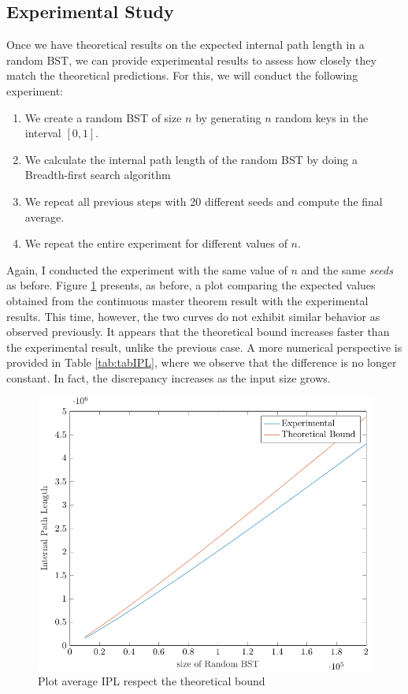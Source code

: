 \subsection{Experimental Study}
Once we have theoretical results on the expected internal path length in a random BST, we can provide experimental results to assess how closely they match the theoretical predictions. For this, we will conduct the following experiment:

\begin{enumerate}
    \item We create a random BST of size \( n \) by generating \( n \) random keys in the interval \( [0,1] \).
    \item We calculate the internal path length of the random BST by doing a Breadth-first search algorithm
    \item We repeat all previous steps with 20 different seeds and compute the final average.
    \item We repeat the entire experiment for different values of \( n \).
\end{enumerate}

Again, I conducted the experiment with the same value of $n$ and the same \textit{seeds} as before. Figure \ref{fig:plotBoundIPL} presents, as before, a plot comparing the expected values obtained from the continuous master theorem result with the experimental results. This time, however, the two curves do not exhibit similar behavior as observed previously. It appears that the theoretical bound increases faster than the experimental result, unlike the previous case. A more numerical perspective is provided in Table \ref{tab:tabIPL}, where we observe that the difference is no longer constant. In fact, the discrepancy increases as the input size grows.

\begin{figure}[ht]
    \centering
    \includegraphics[scale=0.65]{plotIPL.pdf}
    \caption{Plot average IPL respect the theoretical bound}
    \label{fig:plotBoundIPL}
\end{figure}

